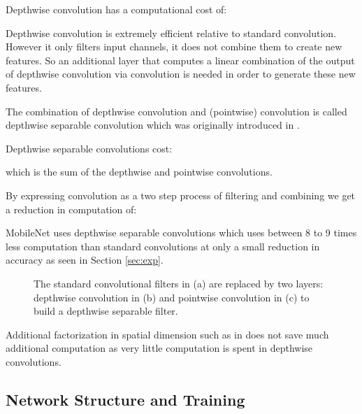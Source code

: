 \documentclass[10pt,twocolumn,letterpaper]{article}
\begin{document}
Depthwise convolution has a computational cost of:



Depthwise convolution is extremely efficient relative to standard convolution. However it only filters input channels, it does not combine them to create new features. So an additional layer that computes a linear combination of the output of depthwise convolution via  convolution is needed in order to generate these new features.

The combination of depthwise convolution and  (pointwise) convolution is called depthwise separable convolution which was originally introduced in \cite{sifre2014rigid}.

Depthwise separable convolutions cost:


which is the sum of the depthwise and  pointwise convolutions. 

By expressing convolution as a two step process of filtering and combining we get a reduction in computation of:



MobileNet uses  depthwise separable convolutions which uses between 8 to 9 times less computation than standard convolutions at only a small reduction in accuracy as seen in Section \ref{sec:exp}.

\begin{figure}[t]
\centering
{}

\caption{The standard convolutional filters in (a) are replaced by two layers: depthwise convolution in (b) and pointwise convolution in (c) to build a depthwise separable filter.}
\label{fig:dw_conv}
\end{figure}

Additional factorization in spatial dimension such as in \cite{jin2014flattened,szegedy2015rethinking} does not save much additional computation as very little computation is spent in depthwise convolutions.

\subsection{Network Structure and Training}
\end{document}
